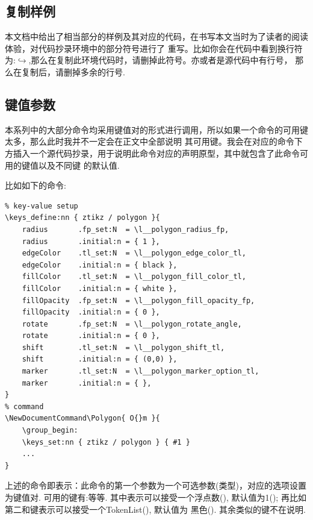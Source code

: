 \subsection{复制样例}
本文档中给出了相当部分的样例及其对应的代码，在书写本文当时为了读者的阅读体验，对代码抄录环境中的部分符号进行了
重写。比如你会在代码中看到换行符为:$\hookrightarrow$,那么在复制此环境代码时，请删掉此符号。亦或者是源代码中有行号，
那么在复制后，请删掉多余的行号.

\subsection{键值参数}
本系列中的大部分命令均采用键值对的形式进行调用，所以如果一个命令的可用键太多，那么此时我并不一定会在正文中全部说明
其可用键。我会在对应的命令下方插入一个源代码抄录，用于说明此命令对应的声明原型，其中就包含了此命令可用的键值以及不同键
的默认值.

比如如下的命令:
\begin{verbatim}
% key-value setup
\keys_define:nn { ztikz / polygon }{
    radius       .fp_set:N  = \l__polygon_radius_fp,
    radius       .initial:n = { 1 },
    edgeColor    .tl_set:N  = \l__polygon_edge_color_tl,
    edgeColor    .initial:n = { black },
    fillColor    .tl_set:N  = \l__polygon_fill_color_tl,
    fillColor    .initial:n = { white },
    fillOpacity  .fp_set:N  = \l__polygon_fill_opacity_fp,
    fillOpacity  .initial:n = { 0 },
    rotate       .fp_set:N  = \l__polygon_rotate_angle,
    rotate       .initial:n = { 0 },
    shift        .tl_set:N  = \l__polygon_shift_tl,
    shift        .initial:n = { (0,0) },
    marker       .tl_set:N  = \l__polygon_marker_option_tl,
    marker       .initial:n = { },
}
% command
\NewDocumentCommand\Polygon{ O{}m }{
    \group_begin:
    \keys_set:nn { ztikz / polygon } { #1 }
    ... 
}
\end{verbatim}

上述的\cmd{\Polygon}命令即表示：此命令的第一个参数为一个可选参数(类型)，对应的选项设置为键值对.
可用的键有:等等. 
其中表示可以接受一个浮点数(), 默认值为1(); 
再比如第二和键表示可以接受一个TokenList(), 默认值为
黑色(). 其余类似的键不在说明.